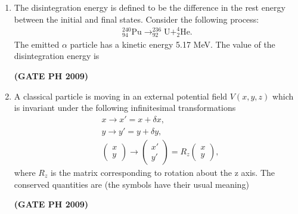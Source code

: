 \documentclass[14pt, a4paper]{extarticle}
\begin{document}
\begin{enumerate}[label=\textbf{Q. \arabic*}, start=21]
\item The disintegration energy is defined to be the difference in the rest energy between the initial and final states.
Consider the following process:
\begin{align*} ^{240}_{94}\text{Pu} \rightarrow ^{236}_{92}\text{U} + ^{4}_{2}\text{He}. \end{align*}
The emitted $\alpha$ particle has a kinetic energy 5.17 MeV. The value of the disintegration energy is
\begin{enumerate}
\end{enumerate}
\hfill \textbf{(GATE PH 2009)}

\item A classical particle is moving in an external potential field $V(x,y,z)$ which is invariant under the following infinitesimal transformations
\begin{align*}
& x \rightarrow x' = x + \delta x, \\
& y \rightarrow y' = y + \delta y, \\
& \begin{pmatrix} x \\ y \end{pmatrix} \rightarrow \begin{pmatrix} x' \\ y' \end{pmatrix} = R_z \begin{pmatrix} x \\ y \end{pmatrix},
\end{align*}
where $R_z$ is the matrix corresponding to rotation about the z axis.
The conserved quantities are (the symbols have their usual meaning)
\begin{enumerate}
\end{enumerate}
\hfill \textbf{(GATE PH 2009)}


\end{enumerate}
\end{document}
